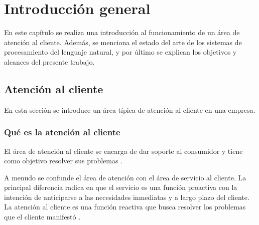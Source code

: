 
\chapter{Introducción general} %

\label{Chapter1} %
\label{IntroGeneral}


\newcommand{\keyword}[1]{\textbf{#1}}
\newcommand{\tabhead}[1]{\textbf{#1}}
\newcommand{\code}[1]{\texttt{#1}}
\newcommand{\file}[1]{\texttt{\bfseries#1}}
\newcommand{\option}[1]{\texttt{\itshape#1}}
\newcommand{\grados}{$^{\circ}$}


En este capítulo se realiza una introducción al funcionamiento de un área de atención al cliente. Además, se menciona el estado del arte de los sistemas de procesamiento del lenguaje natural, y por último se explican los objetivos y alcances del presente trabajo.

\section{Atención al cliente}

En esta sección se introduce un área típica de atención al cliente en una empresa.

\subsection{Qué es la atención al cliente}

El área de atención al cliente se encarga de dar soporte al consumidor y tiene como objetivo resolver sus problemas \citep{WEBSITE:1}.

A menudo se confunde el área de atención con el área de servicio al cliente. La principal diferencia radica en que el servicio es una función proactiva con la intención de anticiparse a las necesidades inmediatas y a largo plazo del cliente. La atención al cliente es una función reactiva que busca resolver los problemas que el cliente manifestó \citep{WEBSITE:3}.

